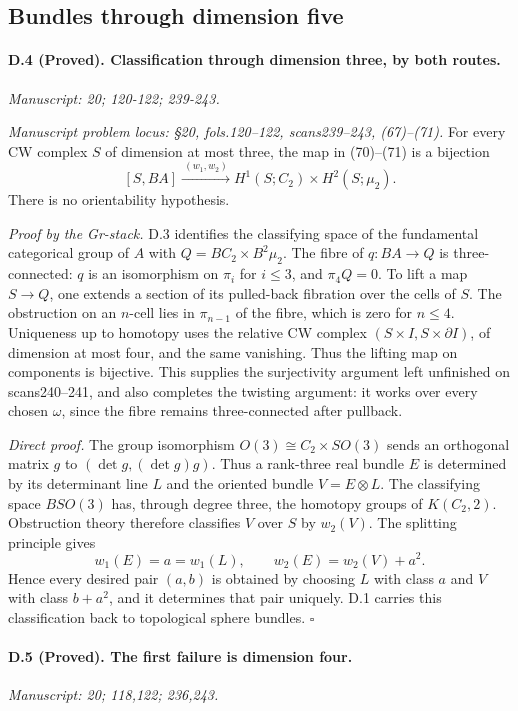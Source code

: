 \subsection{Bundles through dimension five}

\paragraph{D.4 (Proved). Classification through dimension three, by both routes.}
\textit{Manuscript: 20; 120-122; 239-243.}

\emph{Manuscript problem locus: \S20, fols.120--122, scans239--243, (67)--(71).}
For every CW complex $S$ of dimension at most three, the map in (70)--(71) is a bijection
\[
[S,BA]\xrightarrow{\ (w_1,w_2)\ }
 H^1(S;C_2)\times H^2(S;\mu_2).
\]
There is no orientability hypothesis.

\emph{Proof by the Gr-stack.} D.3 identifies the classifying space of the fundamental categorical group of $A$ with $Q=BC_2\times B^2\mu_2$. The fibre of $q:BA\to Q$ is three-connected: $q$ is an isomorphism on $\pi_i$ for $i\leq3$, and $\pi_4Q=0$. To lift a map $S\to Q$, one extends a section of its pulled-back fibration over the cells of $S$. The obstruction on an $n$-cell lies in $\pi_{n-1}$ of the fibre, which is zero for $n\leq4$. Uniqueness up to homotopy uses the relative CW complex $(S\times I,S\times\partial I)$, of dimension at most four, and the same vanishing. Thus the lifting map on components is bijective. This supplies the surjectivity argument left unfinished on scans240--241, and also completes the twisting argument: it works over every chosen $\omega$, since the fibre remains three-connected after pullback.

\emph{Direct proof.} The group isomorphism
$O(3)\cong C_2\times SO(3)$ sends an orthogonal matrix $g$ to $(\det g,(\det g)g)$. Thus a rank-three real bundle $E$ is determined by its determinant line $L$ and the oriented bundle $V=E\otimes L$. The classifying space $BSO(3)$ has, through degree three, the homotopy groups of $K(C_2,2)$. Obstruction theory therefore classifies $V$ over $S$ by $w_2(V)$. The splitting principle gives
\[
w_1(E)=a=w_1(L),\qquad w_2(E)=w_2(V)+a^2.
\]
Hence every desired pair $(a,b)$ is obtained by choosing $L$ with class $a$ and $V$ with class $b+a^2$, and it determines that pair uniquely. D.1 carries this classification back to topological sphere bundles. \hfill$\square$

\paragraph{D.5 (Proved). The first failure is dimension four.}
\textit{Manuscript: 20; 118,122; 236,243.}

